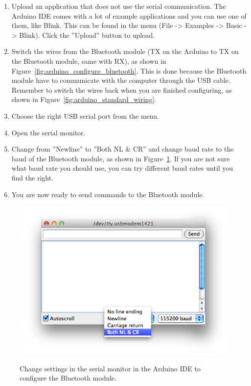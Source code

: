 		\begin{enumerate}
		\item Upload an application that does not use the serial communication. The Arduino IDE comes with a lot of example applications and you can use one of them, like Blink. This can be found in the menu (File -> Examples -> Basic -> Blink). Click the ''Upload'' button to upload.
		
		\item Switch the wires from the Bluetooth module (TX on the Arduino to TX on the Bluetooth module, same with RX), as shown in Figure~\ref{fig:arduino_configure_bluetooth}. This is done because the Bluetooth module have to communicate with the computer through the USB cable. Remember to switch the wires back when you are finished configuring, as shown in Figure~\ref{fig:arduino_standard_wiring}.
		
		\item Choose the right USB serial port from the menu.
		
		\item Open the serial monitor.
		
		\item Change from ''Newline'' to ''Both NL \& CR'' and change baud rate to the baud of the Bluetooth module, as shown in Figure~\ref{fig:serial_monitor}. If you are not sure what baud rate you should use, you can try different baud rates until you find the right.
		
		\item You are now ready to send commands to the Bluetooth module.
		\end{enumerate}
		
		\begin{figure}[H]
			\centering
			\includegraphics[scale=0.5]{images/serial_monitor.png}
			\label{fig:serial_monitor}
			\caption{Change settings in the serial monitor in the Arduino IDE to configure the Bluetooth module.}
		\end{figure}
		
